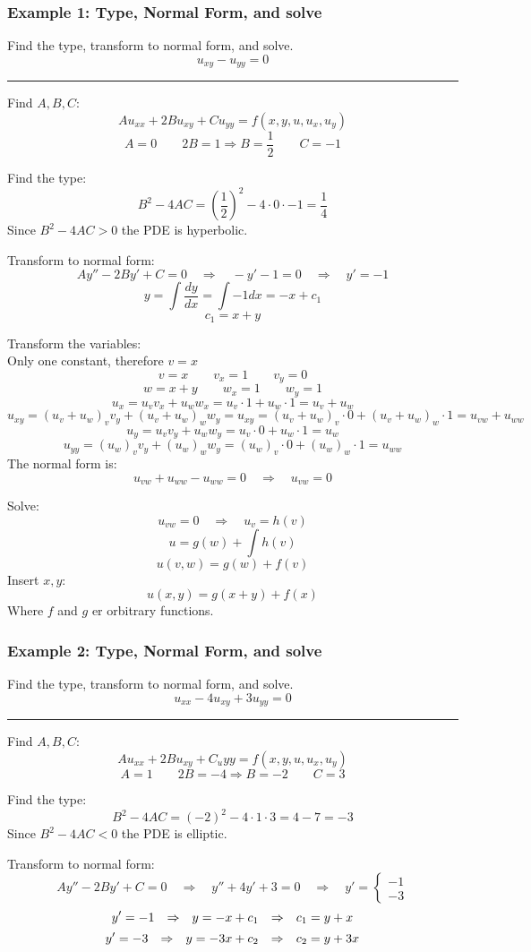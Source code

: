 \subsubsection{Example 1: Type, Normal Form, and solve}
Find the type, transform to normal form, and solve.
$$u_{xy}-u_{yy}=0$$

\rule{\textwidth}{0.5pt}

Find $A,B,C$:
$$Au_{xx}+2Bu_{xy}+Cu_{yy}=f(x,y,u,u_x,u_y)$$
$$A=0\qquad 2B=1\Rightarrow B=\frac{1}{2}\qquad C=-1$$

Find the type:
$$B^2-4AC=\left(\frac{1}{2}\right)^2-4\cdot 0\cdot -1=\frac{1}{4}$$
Since $B^2-4AC>0$ the PDE is hyperbolic.

Transform to normal form:
$$Ay''-2By'+C=0\quad\Rightarrow\quad-y'-1=0\quad\Rightarrow\quad y'=-1$$
$$y=\int \frac{dy}{dx}=\int -1dx=-x+c_1$$
$$c_1=x+y$$

Transform the variables:\\
Only one constant, therefore $v=x$
$$v=x\qquad v_x=1\qquad v_y=0$$
$$w=x+y\qquad w_x=1\qquad w_y=1$$
$$u_x=u_v v_x+u_w w_x=u_v \cdot 1+u_w \cdot 1=u_v+u_w$$
$$u_{xy}=(u_v+u_w)_v v_y+(u_v+u_w)_w w_y=u_{xy}=(u_v+u_w)_v \cdot 0+(u_v+u_w)_w \cdot 1=\boxed{u_{vw}+u_{ww}}$$
$$u_y=u_v v_y + u_w w_y=u_v \cdot 0 + u_w \cdot 1=u_w$$
$$u_{yy}=(u_w)_v v_y+(u_w)_w w_y=(u_w)_v \cdot 0+(u_w)_w \cdot 1=\boxed{u_{ww}}$$
The normal form is:
$$u_{vw}+u_{ww}-u_{ww}=0\quad\Rightarrow\quad \boxed{u_{vw}=0}$$

Solve:
$$u_{vw}=0\quad\Rightarrow\quad u_v=h(v)$$
$$u=g(w)+\int h(v)$$
$$u(v,w)=g(w)+f(v)$$
Insert $x,y$:
$$u(x,y)=g(x+y)+f(x)$$
Where $f$ and $g$ er orbitrary functions.

\subsubsection{Example 2: Type, Normal Form, and solve}
Find the type, transform to normal form, and solve.
$$u_{xx}-4u_{xy}+3u_{yy}=0$$

\rule{\textwidth}{0.5pt}

Find $A,B,C$:
$$Au_{xx}+2Bu_{xy}+C_u{yy}=f(x,y,u,u_x,u_y)$$
$$A=1\qquad 2B=-4\Rightarrow B=-2\qquad C=3$$

Find the type:
$$B^2-4AC=(-2)^2-4\cdot 1\cdot 3=4-7=-3$$
Since $B^2-4AC<0$ the PDE is elliptic.

Transform to normal form:
$$Ay''-2By'+C=0\quad\Rightarrow\quad y''+4y'+3=0\quad\Rightarrow\quad y'=\begin{cases}
 -1\\
 -3
\end{cases}$$
$$y'=-1{\quad\Rightarrow\quad} y=-x+c_1{\quad\Rightarrow\quad} c_1=y+x$$
$$y'=-3{\quad\Rightarrow\quad} y=-3x+c_2{\quad\Rightarrow\quad} c_2=y+3x$$

